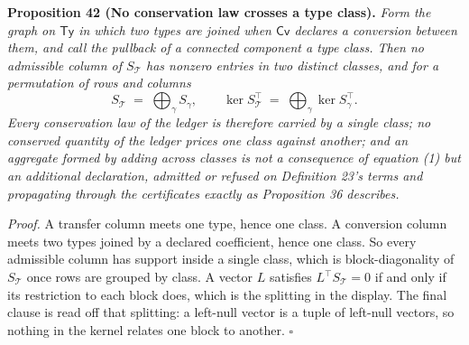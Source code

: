 \documentclass[11pt]{article}
\begin{document}
\textbf{Proposition 42 (No conservation law crosses a type class).} \emph{Form the graph on \(\mathsf{Ty}\) in which two
types are joined when \(\mathsf{Cv}\) declares a conversion between them, and call the pullback of a connected
component a type class. Then no admissible column of \(S_{\mathcal{T}}\) has nonzero entries in two distinct
classes, and for a permutation of rows and columns}
\[ S_{\mathcal{T}} \;=\; \bigoplus_{\gamma} S_{\gamma}, \qquad \ker S_{\mathcal{T}}^{\top} \;=\; \bigoplus_{\gamma} \ker S_{\gamma}^{\top} . \]
\emph{Every conservation law of the ledger is therefore carried by a single class; no conserved quantity of the
ledger prices one class against another; and an aggregate formed by adding across classes is not a consequence
of equation (1) but an additional declaration, admitted or refused on Definition 23's terms and propagating
through the certificates exactly as Proposition 36 describes.}

\emph{Proof.} A transfer column meets one type, hence one class. A conversion column meets two types joined by a declared coefficient, hence one class. So every admissible column has support inside a single class, which is block-diagonality of \(S_{\mathcal{T}}\) once rows are grouped by class. A vector \(L\) satisfies \(L^{\top} S_{\mathcal{T}} = 0\) if and only if its restriction to each block does, which is the splitting in the display. The final clause is read off that splitting: a left-null vector is a tuple of left-null vectors, so nothing in the kernel relates one block to another. \ensuremath{\square}
\end{document}
